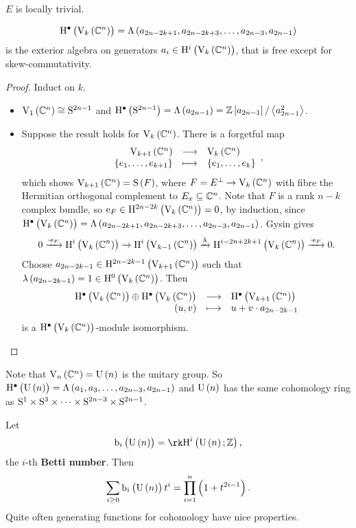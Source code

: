 \begin{exercise*}
$ E $ is locally trivial.
\end{exercise*}

\begin{proposition}
$$ \H^\bullet\br{\V_k\br{\CC^n}} = \Lambda\br{a_{2n - 2k + 1}, a_{2n - 2k + 3}, \dots, a_{2n - 3}, a_{2n - 1}} $$
is the exterior algebra on generators $ a_i \in \H^i\br{\V_k\br{\CC^n}} $, that is free except for skew-commutativity.
\end{proposition}

\begin{proof}
Induct on $ k $.
\begin{itemize}
\item $ \V_1\br{\CC^n} \cong \S^{2n - 1} $ and $ \H^\bullet\br{\S^{2n - 1}} = \Lambda\br{a_{2n - 1}} = \ZZ\sbr{a_{2n - 1}} / \abr{a_{2n - 1}^2} $.
\item Suppose the result holds for $ \V_k\br{\CC^n} $. There is a forgetful map
$$ \function{\V_{k + 1}\br{\CC^n}}{\V_k\br{\CC^n}}{\cbr{e_1, \dots, e_{k + 1}}}{\cbr{e_1, \dots, e_k}}, $$
which shows $ \V_{k + 1}\br{\CC^n} = \S\br{F} $, where $ F = E^\perp \to \V_k\br{\CC^n} $ with fibre the Hermitian orthogonal complement to $ E_x \subseteq \CC^n $. Note that $ F $ is a rank $ n - k $ complex bundle, so $ \e_F \in \H^{2n - 2k}\br{\V_k\br{\CC^n}} = 0 $, by induction, since $ \H^\bullet\br{\V_k\br{\CC^n}} = \Lambda\br{a_{2n - 2k + 1}, a_{2n - 2k + 3}, \dots, a_{2n - 3}, a_{2n - 1}} $. Gysin gives
$$ 0 \xrightarrow{\cdot \e_F} \H^i\br{\V_k\br{\CC^n}} \to \H^i\br{\V_{k - 1}\br{\CC^n}} \xrightarrow{\lambda} \H^{i - 2n + 2k + 1}\br{\V_k\br{\CC^n}} \xrightarrow{\cdot \e_F} 0. $$
Choose $ a_{2n - 2k - 1} \in \H^{2n - 2k - 1}\br{\V_{k + 1}\br{\CC^n}} $ such that $ \lambda\br{a_{2n - 2k - 1}} = 1 \in \H^0\br{\V_k\br{\CC^n}} $. Then
$$ \function{\H^\bullet\br{\V_k\br{\CC^n}} \oplus \H^\bullet\br{\V_k\br{\CC^n}}}{\H^\bullet\br{\V_{k + 1}\br{\CC^n}}}{\br{u, v}}{u + v \cdot a_{2n - 2k - 1}} $$
is a $ \H^\bullet\br{\V_k\br{\CC^n}} $-module isomorphism.
\end{itemize}
\end{proof}

Note that $ \V_n\br{\CC^n} = \U\br{n} $ is the unitary group. So $ \H^\bullet\br{\U\br{n}} = \Lambda\br{a_1, a_3, \dots, a_{2n - 3}, a_{2n - 1}} $ and $ \U\br{n} $ has the same cohomology ring as $ \S^1 \times \S^3 \times \dots \times \S^{2n - 3} \times \S^{2n - 1} $.

\begin{remark*}
Let
$$ \b_i\br{\U\br{n}} = \rk \H^i\br{\U\br{n}; \ZZ}, $$
the $ i $-th \textbf{Betti number}. Then
$$ \sum_{i \ge 0} \b_i\br{\U\br{n}}t^i = \prod_{i = 1}^n \br{1 + t^{2i - 1}}. $$
Quite often generating functions for cohomology have nice properties.
\end{remark*}

